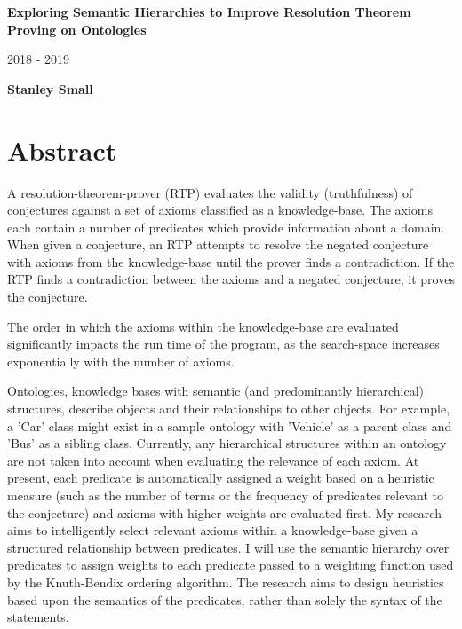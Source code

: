 \documentclass{article}
\begin{document}
\begin{titlepage}
    \begin{center}
        \vspace*{1cm}
        
        \textbf{Exploring Semantic Hierarchies to Improve Resolution Theorem Proving on Ontologies}
        
        \vspace{0.5cm}
        2018 - 2019
        
        \vspace{1.5cm}
        
        \textbf{Stanley Small}
        
    \end{center}
\end{titlepage}

\tableofcontents

\newpage

\section{Abstract}
A resolution-theorem-prover (RTP) evaluates the validity (truthfulness) of conjectures against a set of axioms classified as a knowledge-base. The axioms each contain a number of predicates which provide information about a domain. When given a conjecture, an RTP attempts to resolve the negated conjecture with axioms from the knowledge-base until the prover finds a contradiction. If the RTP finds a contradiction between the axioms and a negated conjecture, it proves the conjecture. 

The order in which the axioms within the knowledge-base are evaluated significantly impacts the run time of the program, as the search-space increases exponentially with the number of axioms. 

Ontologies, knowledge bases with semantic (and predominantly hierarchical) structures, describe objects and their relationships to other objects. For example, a 'Car' class might exist in a sample ontology with 'Vehicle' as a parent class and 'Bus' as a sibling class. Currently, any hierarchical structures within an ontology are not taken into account when evaluating the relevance of each axiom. At present, each predicate is automatically assigned a weight based on a heuristic measure (such as the number of terms or the frequency of predicates relevant to the conjecture) and axioms with higher weights are evaluated first. My research aims to intelligently select relevant axioms within a knowledge-base given a structured relationship between predicates. I will use the semantic hierarchy over predicates to assign weights to each predicate passed to a weighting function used by the Knuth-Bendix ordering algorithm. The research aims to design heuristics based upon the semantics of the predicates, rather than solely the syntax of the statements. 
\end{document}
